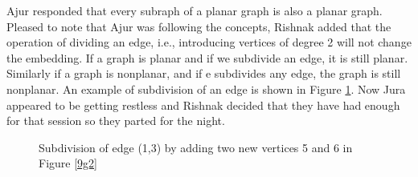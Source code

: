 Ajur responded that every subraph of a planar graph is also a planar graph. Pleased to note that Ajur was following the concepts, Rishnak added that the operation of dividing an edge, i.e., introducing vertices of degree 2 will not change the embedding. If a graph is planar and if we subdivide an edge, it is still planar. Similarly if a graph is nonplanar, and if e subdivides any edge, the graph is still nonplanar. An example of subdivision of an edge is shown in Figure \ref{9g9}. Now Jura appeared to be getting restless and Rishnak decided that they have had enough for that session  so they parted for the night.

\begin{figure}[h]
\begin{center}
\caption{ Subdivision of edge (1,3) by adding two new vertices 5 and 6 in Figure \ref{9g2}}\label{9g9}
\end{center}
\end{figure}
